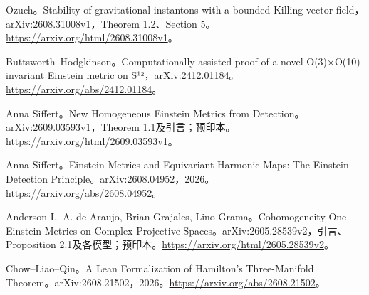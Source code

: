 \documentclass[11pt,a4paper]{article}
\theoremstyle{definition}
\begin{document}
\begin{enumerate}[label={[\arabic*]},leftmargin=2.2em,itemsep=0.55em]
\item Ozuch。Stability of gravitational instantons with a bounded Killing vector field，arXiv:2608.31008v1，Theorem 1.2、Section 5。\url{https://arxiv.org/html/2608.31008v1}。
\item Buttsworth--Hodgkinson。Computationally-assisted proof of a novel O(3)×O(10)-invariant Einstein metric on S¹²，arXiv:2412.01184。\url{https://arxiv.org/abs/2412.01184}。
\item Anna Siffert。New Homogeneous Einstein Metrics from Detection。arXiv:2609.03593v1，Theorem 1.1及引言；预印本。\url{https://arxiv.org/html/2609.03593v1}。
\item Anna Siffert。Einstein Metrics and Equivariant Harmonic Maps: The Einstein Detection Principle。arXiv:2608.04952，2026。\url{https://arxiv.org/abs/2608.04952}。
\item Anderson L. A. de Araujo, Brian Grajales, Lino Grama。Cohomogeneity One Einstein Metrics on Complex Projective Spaces。arXiv:2605.28539v2，引言、Proposition 2.1及各模型；预印本。\url{https://arxiv.org/html/2605.28539v2}。
\item Chow--Liao--Qin。A Lean Formalization of Hamilton's Three-Manifold Theorem。arXiv:2608.21502，2026。\url{https://arxiv.org/abs/2608.21502}。
\end{enumerate}
\end{document}

